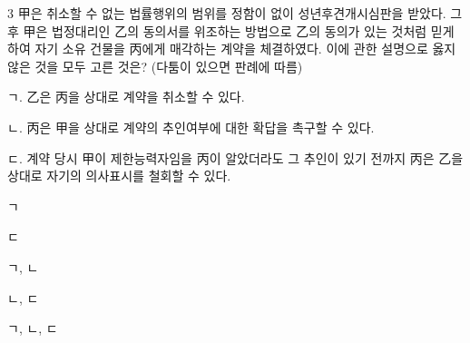 \begin{question}{3}
甲은 취소할 수 없는 법률행위의 범위를 정함이 없이 성년후견개시심판을 받았다. 그 후 甲은 법정대리인 乙의 동의서를 위조하는 방법으로 乙의 동의가 있는 것처럼 믿게 하여 자기 소유 건물을 丙에게 매각하는 계약을 체결하였다. 이에 관한 설명으로 옳지 않은 것을 모두 고른 것은? (다툼이 있으면 판례에 따름)
\begin{framedtext}
ㄱ. 乙은 丙을 상대로 계약을 취소할 수 있다. \par
ㄴ. 丙은 甲을 상대로 계약의 추인여부에 대한 확답을 촉구할 수 있다. \par
ㄷ. 계약 당시 甲이 제한능력자임을 丙이 알았더라도 그 추인이 있기 전까지 丙은 乙을 상대로 자기의 의사표시를 철회할 수 있다. \par
\end{framedtext}
\begin{choices}
  \item ㄱ
  \item ㄷ
  \item ㄱ, ㄴ
  \item ㄴ, ㄷ
  \item ㄱ, ㄴ, ㄷ
\end{choices}
\end{question}
